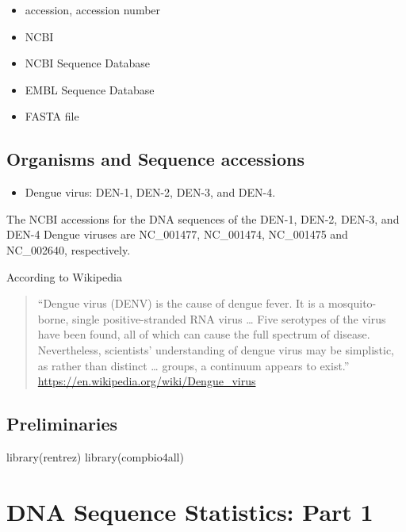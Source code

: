 \documentclass[
]{book}
\newenvironment{Shaded}{\begin{snugshade}}{\end{snugshade}}
\newcommand{\FunctionTok}[1]{\textcolor[rgb]{0.00,0.00,0.00}{#1}}
\newcommand{\NormalTok}[1]{#1}
\providecommand{\tightlist}{%
  \setlength{\itemsep}{0pt}\setlength{\parskip}{0pt}}
\begin{document}
\begin{itemize}
\tightlist
\item
  accession, accession number
\item
  NCBI
\item
  NCBI Sequence Database
\item
  EMBL Sequence Database
\item
  FASTA file
\end{itemize}

\hypertarget{organisms-and-sequence-accessions}{%
\subsection{Organisms and Sequence accessions}\label{organisms-and-sequence-accessions}}

\begin{itemize}
\tightlist
\item
  Dengue virus: DEN-1, DEN-2, DEN-3, and DEN-4.
\end{itemize}

The NCBI accessions for the DNA sequences of the DEN-1, DEN-2, DEN-3, and DEN-4 Dengue viruses are NC\_001477, NC\_001474, NC\_001475 and NC\_002640, respectively.

According to Wikipedia

\begin{quote}
``Dengue virus (DENV) is the cause of dengue fever. It is a mosquito-borne, single positive-stranded RNA virus \ldots{} Five serotypes of the virus have been found, all of which can cause the full spectrum of disease. Nevertheless, scientists' understanding of dengue virus may be simplistic, as rather than distinct \ldots{} groups, a continuum appears to exist.'' \url{https://en.wikipedia.org/wiki/Dengue_virus}
\end{quote}

\hypertarget{preliminaries-1}{%
\subsection{Preliminaries}\label{preliminaries-1}}

\begin{Shaded}
\begin{Highlighting}[]
\FunctionTok{library}\NormalTok{(rentrez)}
\FunctionTok{library}\NormalTok{(compbio4all)  }
\end{Highlighting}
\end{Shaded}

\hypertarget{dna-sequence-statistics-part-1}{%
\section{DNA Sequence Statistics: Part 1}\label{dna-sequence-statistics-part-1}}
\end{document}

